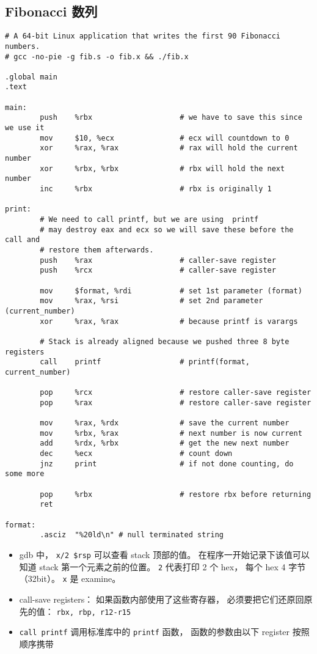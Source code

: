 \subsection{Fibonacci 数列}
\begin{lstlisting}[language=none, caption=fib.s]
# A 64-bit Linux application that writes the first 90 Fibonacci numbers.
# gcc -no-pie -g fib.s -o fib.x && ./fib.x

.global main
.text

main:
        push    %rbx                    # we have to save this since we use it
        mov     $10, %ecx               # ecx will countdown to 0
        xor     %rax, %rax              # rax will hold the current number
        xor     %rbx, %rbx              # rbx will hold the next number
        inc     %rbx                    # rbx is originally 1

print:
        # We need to call printf, but we are using  printf
        # may destroy eax and ecx so we will save these before the call and
        # restore them afterwards.
        push    %rax                    # caller-save register
        push    %rcx                    # caller-save register

        mov     $format, %rdi           # set 1st parameter (format)
        mov     %rax, %rsi              # set 2nd parameter (current_number)
        xor     %rax, %rax              # because printf is varargs

        # Stack is already aligned because we pushed three 8 byte registers
        call    printf                  # printf(format, current_number)

        pop     %rcx                    # restore caller-save register
        pop     %rax                    # restore caller-save register

        mov     %rax, %rdx              # save the current number
        mov     %rbx, %rax              # next number is now current
        add     %rdx, %rbx              # get the new next number
        dec     %ecx                    # count down
        jnz     print                   # if not done counting, do some more

        pop     %rbx                    # restore rbx before returning
        ret

format:
        .asciz  "%20ld\n" # null terminated string
\end{lstlisting}

\begin{itemize}
\item gdb 中， \verb`x/2 $rsp` 可以查看 stack 顶部的值。 在程序一开始记录下该值可以知道 stack 第一个元素之前的位置。 \verb`2` 代表打印 2 个 hex， 每个 hex 4 字节（32bit）。 \verb`x` 是 examine。
\item call-save registers： 如果函数内部使用了这些寄存器， 必须要把它们还原回原先的值： \verb`rbx, rbp, r12-r15`
\item \verb`call printf` 调用标准库中的 \verb`printf` 函数， 函数的参数由以下 register 按照顺序携带
\end{itemize}
